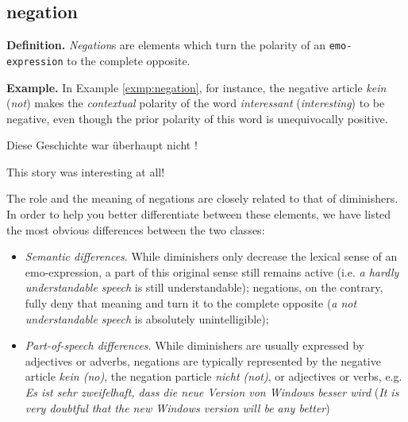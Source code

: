 \subsection{negation}
\noindent\textbf{Definition.} \emph{Negation}s are elements which turn
the polarity of an \texttt{emo-expression} to the complete opposite.

\noindent\textbf{Example.} In Example \ref{exmp:negation}, for
instance, the negative article \textit{kein} (\textit{not}) makes the
\emph{contextual} polarity of the word \textit{interessant}
(\textit{interesting}) to be negative, even though the prior polarity
of this word is unequivocally positive.
\begin{example}
Diese Geschichte war \"uberhaupt nicht !

This story was  interesting at all!\label{exmp:negation}
\end{example}

The role and the meaning of negations are closely related to that of
diminishers.  In order to help you better differentiate between these
elements, we have listed the most obvious differences between the two
classes:
\begin{itemize}
  \item\textit{Semantic differences}.  While diminishers only decrease
    the lexical sense of an emo-expression, a part of this original
    sense still remains active (i.e. \textit{a hardly understandable
      speech} is still understandable); negations, on the contrary,
    fully deny that meaning and turn it to the complete opposite
    (\textit{a not understandable speech} is absolutely
    unintelligible);

  \item\textit{Part-of-speech differences}.  While diminishers are
    usually expressed by adjectives or adverbs, negations are
    typically represented by the negative article \textit{kein (no)},
    the negation particle \textit{nicht (not)}, or adjectives or
    verbs, e.g.  \textit{Es ist sehr zweifelhaft, dass die neue
      Version von Windows besser wird} (\textit{It is very doubtful
      that the new Windows version will be any better})

\end{itemize}

